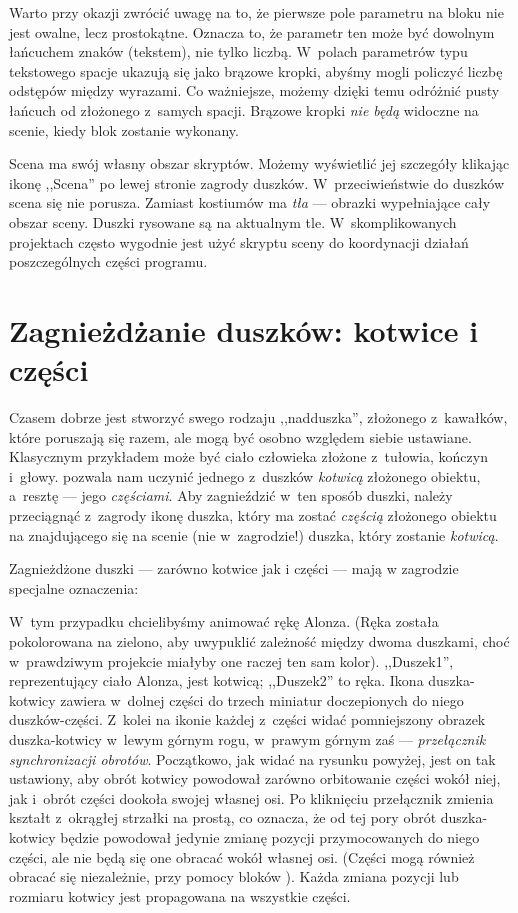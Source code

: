 \documentclass{report}
\begin{document}
Warto przy okazji zwrócić uwagę na to, że pierwsze pole parametru na bloku  nie jest owalne, lecz prostokątne. Oznacza to, że parametr ten może być dowolnym łańcuchem znaków (tekstem), nie tylko liczbą. W~polach parametrów typu tekstowego spacje ukazują się jako brązowe kropki, abyśmy mogli policzyć liczbę odstępów między wyrazami. Co ważniejsze, możemy dzięki temu odróżnić pusty łańcuch od złożonego z~samych spacji. Brązowe kropki \emph{nie będą} widoczne na scenie, kiedy blok zostanie wykonany.

Scena ma swój własny obszar skryptów. Możemy wyświetlić jej szczegóły klikając ikonę ,,Scena'' po lewej stronie zagrody duszków. W~przeciwieństwie do duszków scena się nie porusza. Zamiast kostiumów ma \emph{tła} --- obrazki wypełniające cały obszar sceny. Duszki rysowane są na aktualnym tle. W~skomplikowanych projektach często wygodnie jest użyć skryptu sceny do koordynacji działań poszczególnych części programu.

\section{Zagnieżdżanie duszków: kotwice i części}
\label{sec:zagnieżdżanie-duszków}

Czasem dobrze jest stworzyć swego rodzaju ,,nadduszka'', złożonego z~kawałków, które poruszają się razem, ale mogą być osobno względem siebie ustawiane. Klasycznym przykładem może być ciało człowieka złożone z~tułowia, kończyn i~głowy. \Snap{} pozwala nam uczynić jednego z~duszków \emph{kotwicą} złożonego obiektu, a~resztę --- jego \emph{częściami}. Aby zagnieździć w~ten sposób duszki, należy przeciągnąć z~zagrody ikonę duszka, który ma zostać \emph{częścią} złożonego obiektu na znajdującego się na scenie (nie w~zagrodzie!) duszka, który zostanie \emph{kotwicą}.

Zagnieżdżone duszki --- zarówno kotwice jak i części --- mają w zagrodzie specjalne oznaczenia:


W~tym przypadku chcielibyśmy animować rękę Alonza. (Ręka została pokolorowana na zielono, aby uwypuklić zależność między dwoma duszkami, choć w~prawdziwym projekcie miałyby one raczej ten sam kolor). ,,Duszek1'', reprezentujący ciało Alonza, jest kotwicą; ,,Duszek2'' to ręka. Ikona duszka-kotwicy zawiera w~dolnej części do trzech miniatur doczepionych do niego duszków-części. Z~kolei na ikonie każdej z~części widać pomniejszony obrazek duszka-kotwicy w~lewym górnym rogu, w~prawym górnym zaś --- \emph{przełącznik synchronizacji obrotów}. Początkowo, jak widać na rysunku powyżej, jest on tak ustawiony, aby obrót kotwicy powodował zarówno orbitowanie części wokół niej, jak i~obrót części dookoła swojej własnej osi. Po kliknięciu przełącznik zmienia kształt z~okrągłej strzałki na prostą, co oznacza, że od tej pory obrót duszka-kotwicy będzie powodował jedynie zmianę pozycji przymocowanych do niego części, ale nie będą się one obracać wokół własnej osi. (Części mogą również obracać się niezależnie, przy pomocy bloków ). Każda zmiana pozycji lub rozmiaru kotwicy jest propagowana na wszystkie części.
\end{document}
